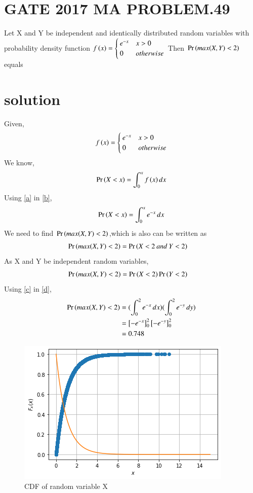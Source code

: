 \documentclass[journal,12pt,twocolumn]{IEEEtran}
\begin{document}
\section{GATE 2017 MA PROBLEM.49}
Let X and Y be independent and identically distributed random variables with probability density function
$f\left(x\right)= \begin{cases}
       e^{-x}  & x>0\\
        0 & otherwise\\
    \end{cases}$
  Then $\Pr\left(max(X,Y)<2\right)$ equals  
  \section{solution}
Given,
\begin{align}
f\left(x\right) = 
    \begin{cases}
       e^{-x}  & x>0\\
        0 & otherwise\\
   \end{cases} \label{a}
\end{align}
We know,
\begin{align}
\Pr\left(X<x\right) = \int_{0}^{x}{f\left(x\right)}\,dx \label{b}
\end{align}
Using \eqref{a} in \eqref{b},
\begin{align}
\Pr\left(X<x\right) = \int_{0}^{x}{e^{-x}}\,dx \label{c}
\end{align}
We need to find $\Pr\left( max(X,Y)<2\right)$,which is also can be written as
\begin{align}
   \Pr\left(max(X,Y)<2\right) &=\Pr\left(X<2\: and \:Y<2\right)
\end{align}
As X and Y be independent random variables,
\begin{align}
   \Pr\left(max(X,Y)<2\right) &=\Pr\left(X<2\right)\Pr\left(Y<2\right) \label{d}
\end{align}
Using \eqref{c} in \eqref{d},
\begin{align}
   \Pr\left(max(X,Y)<2\right) &= (\int_{0}^{2}{e^{-x}}\,dx)(\int_{0}^{2}{e^{-y}}\,dy)\\
   &= \left[-e^{-x}\right]_0^2 \left[-e^{-y}\right]_0^2\\
   &=0.748
\end{align}
\begin{figure}[ht]
    \centering
    \includegraphics[width=\columnwidth]{assign_4.png}
    \caption{CDF  of random variable X}
\label{fig_1}
\end{figure}
\end{document}

